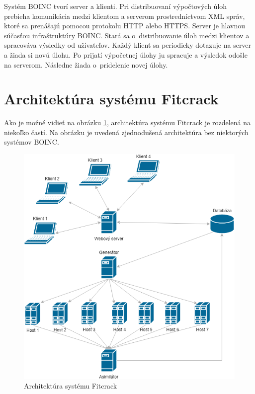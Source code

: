 \documentclass[slovak]{fitthesis}
\begin{document}
Systém BOINC tvorí server a klienti. Pri distribuovaní výpočtových úloh prebieha komunikácia medzi klientom a serverom prostredníctvom XML správ, ktoré sa prenášajú pomocou protokolu HTTP alebo HTTPS.
Server je hlavnou súčasťou infraštruktúry BOINC. Stará sa o~distribuovanie úloh medzi klientov a spracováva výsledky od užívateľov.
Každý klient sa periodicky dotazuje na server a žiada si novú úlohu. Po prijatí výpočetnej úlohy ju spracuje a výsledok odošle na serverom. Následne žiada o~pridelenie novej úlohy.\cite{boinccitace}


\section{Architektúra systému Fitcrack}
Ako je možné vidieť na obrázku \ref{fig:archFitcrack}, architektúra systému Fitcrack je rozdelená na niekoľko častí. Na obrázku je uvedená zjednodušená architektúra bez niektorých systémov BOINC.

\begin{figure}[h]
    \centering
    \includegraphics[scale=0.65]{obrazky/FitcrackSystem.png}
    \caption{Architektúra systému Fitcrack}
    \label{fig:archFitcrack}
\end{figure}
\end{document}

